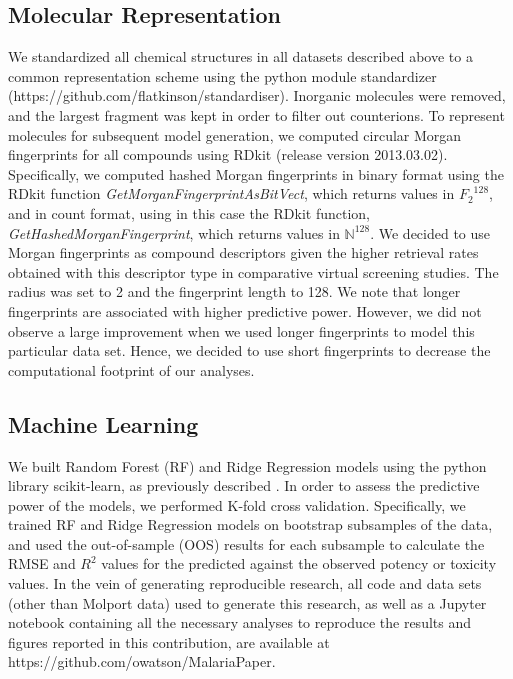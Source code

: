 \documentclass[journal=jacsat,manuscript=article]{achemso}
\begin{document}
\subsection*{Molecular Representation}
We standardized all chemical structures in all datasets described above to a common representation scheme using the python module standardizer (https://github.com/flatkinson/standardiser). Inorganic molecules were removed, and the largest fragment was kept in order to filter out counterions\cite{Fourches2010}. 
To represent molecules for subsequent model generation, we computed circular Morgan fingerprints\cite{Rogers2010} for all compounds using RDkit (release version 2013.03.02)\cite{rdkit}.
Specifically, we computed hashed Morgan fingerprints in binary format 
using the RDkit function \textit{GetMorganFingerprintAsBitVect}, which returns values in ${F_2}^{128}$,
and in count format, using in this case the RDkit function, \textit{GetHashedMorganFingerprint}, which returns values in $\mathbb{N}^{128}$.  
We decided to use Morgan fingerprints as compound descriptors given the higher retrieval rates obtained with this descriptor type in comparative virtual screening studies\cite{Koutsoukas2013}. The radius was set to 2 and the fingerprint length to 128. We note that longer fingerprints are associated with higher predictive power\cite{OBoyle2016}. However, we did not observe a large improvement when we used longer fingerprints to model this particular data set. Hence, we decided to use short fingerprints to decrease the computational footprint of our analyses.


\subsection*{Machine Learning}
We built Random Forest (RF) and Ridge Regression models using the python library scikit-learn\cite{scikit}, as previously described \citep{et1:}.
In order to assess the predictive power of the models, we performed K-fold cross validation. Specifically, 
we trained RF and Ridge Regression models on bootstrap subsamples of the data, and used the out-of-sample (OOS) results for each subsample to calculate the RMSE and $R^2$ values for the predicted against the observed potency or toxicity values.
In the vein of generating reproducible research\cite{Walters2013,Landrum2012}, all code and data sets (other than Molport data) used to generate this research, as well as a Jupyter notebook containing all the necessary analyses to reproduce the results and figures reported in this contribution, are available at https://github.com/owatson/MalariaPaper.
\end{document}
